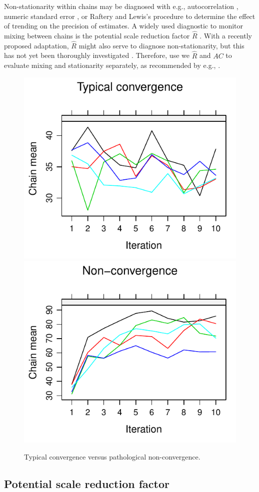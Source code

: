 \documentclass[Royal,times,sageh]{sagej}
\begin{document}
Non-stationarity within chains may be diagnosed with e.g.,
autocorrelation \citep[\(AC\);][]{scha97, gelm13}, numeric standard
error \citep[`MC error';][]{gewe92}, or Raftery and Lewis's
\citeyearpar{raft91} procedure to determine the effect of trending on
the precision of estimates. A widely used diagnostic to monitor mixing
between chains is the potential scale reduction factor \(\widehat{R}\)
\citep[`Gelman-Rubin statistic';][]{gelm92}. With a recently proposed
adaptation, \(\widehat{R}\) might also serve to diagnose
non-stationarity, but this has not yet been thoroughly investigated
\citep{veht19}. Therefore, use we \(\widehat{R}\) and \(AC\) to evaluate
mixing and stationarity separately, as recommended by e.g.,
\citet{cowl96}.

\begin{figure}

{\centering \includegraphics[width=.49\linewidth]{manuscript_files/figure-latex/non-conv-1} \includegraphics[width=.49\linewidth]{manuscript_files/figure-latex/non-conv-2} 

}

\caption{Typical convergence versus pathological non-convergence.}\label{fig:non-conv}
\end{figure}

\hypertarget{potential-scale-reduction-factor}{%
\subsection{Potential scale reduction
factor}\label{potential-scale-reduction-factor}}
\end{document}
